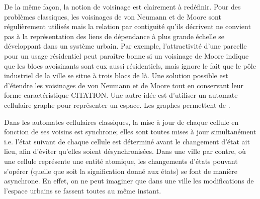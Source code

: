 \documentclass[10pt]{article}
\begin{document}
\begin{multicols}{2}
De la même façon, la notion de voisinage est clairement à
redéfinir. Pour des problèmes classiques, les voisinages de von
Neumann et de Moore sont régulièrement utilisés mais la relation par
contiguité qu'ils décrivent ne convient pas à la représentation des
liens de dépendance à plus grande échelle se développant dans un
système urbain. Par exemple, l'attractivité d'une parcelle pour un
usage résidentiel peut paraître bonne si un voisinage de Moore indique
que les blocs avoisinants sont eux aussi résidentiels, mais ignore le
fait que le pôle industriel de la ville se situe à trois
blocs de là. Une solution possible est d'étendre les voisinages de von
Neumann et de Moore tout en conservant leur forme caractéristique
CITATION. Une autre idée est d'utiliser un automate cellulaire graphe
pour représenter un espace. Les graphes permettent de \cite{0'Sullivan2001}.

Dans les automates cellulaires classiques, la mise à jour de chaque
cellule en fonction de ses voisins est synchrone; elles sont toutes
mises à jour simultanément i.e. l'état suivant de chaque cellule est
déterminé avant le changement d'état ait lieu, afin d'éviter qu'elles
soient désynchronisées. Dans une ville par contre, où une cellule
représente une entité atomique, les changements d'états pouvant
s'opérer (quelle que soit la signification donné aux états) se font de
manière asynchrone. En effet, on ne peut imaginer que dans une ville
les modifications de l'espace urbains se fassent toutes au même
instant.

\end{multicols}

\printbibliography
\end{document}
